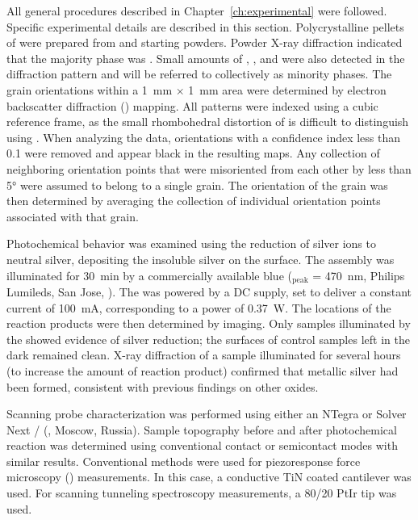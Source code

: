 All general procedures described in Chapter~\ref{ch:experimental} were followed. Specific
experimental details are described in this section. Polycrystalline pellets of 
were prepared from  and  starting powders. Powder X-ray diffraction
indicated that the majority phase was . Small amounts of ,
, and  were also detected in the diffraction pattern and will be
referred to collectively as minority phases. The grain orientations within a
\SI{1}{\milli\meter} $\times$ \SI{1}{\milli\meter} area were determined by electron
backscatter diffraction () mapping. All patterns were indexed using a cubic
reference frame, as the small rhombohedral distortion\cite{Luo:2006kg} of  is
difficult to distinguish using . When analyzing the  data,
orientations with a confidence index less than 0.1 were removed and appear black in the
resulting  maps. Any collection of neighboring orientation points that were
misoriented from each other by less than 5\si{\degree} were assumed to belong to a single
grain. The orientation of the grain was then determined by averaging the collection of
individual orientation points associated with that grain.

Photochemical behavior was examined using the reduction of silver ions to neutral silver,
depositing the insoluble silver on the surface.\cite{CLARK:1965ct,HERRMANN:1988do} The
assembly was illuminated for \SI{30}{\minute} by a commercially available blue 
(\textlambda$_\text{peak}$ = \SI{470}{\nano\meter}, Philips Lumileds, San Jose,
). The  was powered by a DC supply, set to deliver a constant current
of \SI{100}{\milli\ampere}, corresponding to a power of \SI{0.37}{\watt}. The locations of
the reaction products were then determined by  imaging. Only samples illuminated
by the  showed evidence of silver reduction; the surfaces of control samples
left in the dark remained clean. X-ray diffraction of a sample illuminated for several
hours (to increase the amount of reaction product) confirmed that metallic silver had been
formed, consistent with previous findings on other
oxides.\cite{Giocondi:2001gz,Lowekamp:1998ks}

Scanning probe characterization was performed using either an  NTegra or
Solver Next / (, Moscow, Russia). Sample topography
before and after photochemical reaction was determined using conventional contact or
semicontact modes with similar results. Conventional methods were used for piezoresponse
force microscopy () measurements.\cite{Christman:1998vu} In this case, a
conductive TiN coated cantilever was used. For scanning tunneling spectroscopy
measurements, a 80/20 PtIr tip was used.


